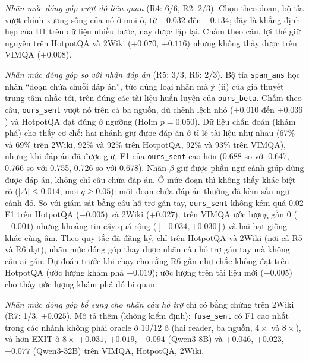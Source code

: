 \documentclass[11pt]{article}
\newcommand{\arm}[1]{\texttt{#1}}
\begin{document}
\emph{Nhãn mức đóng góp vượt độ liên quan} (R4: 6/6, R2: 2/3). Chọn theo đoạn, bộ tỉa vượt chính xương sống của nó ở
mọi ô, từ $+0.032$ đến $+0.134$; đây là khẳng định hẹp của H1 trên dữ liệu nhiều bước, nay được lặp lại. Chấm theo
câu, lợi thế giữ nguyên trên HotpotQA và 2Wiki ($+0.070$, $+0.116$) nhưng không thấy được trên VIMQA ($+0.008$).

\emph{Nhãn mức đóng góp so với nhãn đáp án} (R5: 3/3, R6: 2/3). Bộ tỉa \arm{span\_ans} học nhãn ``đoạn chứa chuỗi
đáp án'', tức đúng loại nhãn mà ý (ii) của giả thuyết trung tâm nhắc tới, trên đúng các tài liệu huấn luyện của
\arm{ours\_beta}. Chấm theo câu, \arm{ours\_sent} vượt nó trên cả ba nguồn, dù chênh lệch nhỏ ($+0.010$ đến $+0.036$)
và HotpotQA đạt đúng ở ngưỡng (Holm $p=0.050$). Dữ liệu chẩn đoán (khám phá) cho thấy cơ chế: hai nhánh giữ được đáp
án ở tỉ lệ tài liệu như nhau (67\% và 69\% trên 2Wiki, 92\% và 92\% trên HotpotQA, 92\% và 93\% trên VIMQA), nhưng khi
đáp án đã được giữ, F1 của \arm{ours\_sent} cao hơn (0.688 so với 0.647, 0.766 so với 0.755, 0.726 so với 0.678).
Nhãn $\beta$ giữ được phần ngữ cảnh giúp dùng được đáp án, không chỉ câu chứa đáp án. Ở mức đoạn thì không thấy
khác biệt rõ ($|\Delta|\le0.014$, mọi $q\ge0.05$): một đoạn chứa đáp án thường đã kèm sẵn ngữ cảnh đó. So với giám sát
bằng câu hỗ trợ gán tay, \arm{ours\_sent} không kém quá 0.02 F1 trên HotpotQA ($-0.005$) và 2Wiki ($+0.027$); trên
VIMQA ước lượng gần 0 ($-0.001$) nhưng khoảng tin cậy quá rộng ($[-0.034, +0.030]$) và hai hạt giống khác cùng âm.
Theo quy tắc đã đăng ký, chỉ trên HotpotQA và 2Wiki (nơi cả R5 và R6 đạt), nhãn mức đóng góp thay được nhãn câu hỗ
trợ gán tay mà không cần ai gán. Dự đoán trước khi chạy cho rằng R6 gần như chắc không đạt trên HotpotQA (ước lượng
khám phá $-0.019$); ước lượng trên tài liệu mới ($-0.005$) cho thấy ước lượng khám phá đó bi quan.

\emph{Nhãn mức đóng góp bổ sung cho nhãn câu hỗ trợ} chỉ có bằng chứng trên 2Wiki (R7: 1/3, $+0.025$). Mô tả thêm
(không kiểm định): \arm{fuse\_sent} có F1 cao nhất trong các nhánh không phải oracle ở 10/12 ô (hai reader, ba nguồn,
$4\times$ và $8\times$), và hơn EXIT ở $8\times$ $+0.031$, $+0.019$, $+0.094$ (Qwen3-8B) và $+0.046$, $+0.023$,
$+0.077$ (Qwen3-32B) trên VIMQA, HotpotQA, 2Wiki.

\end{document}
